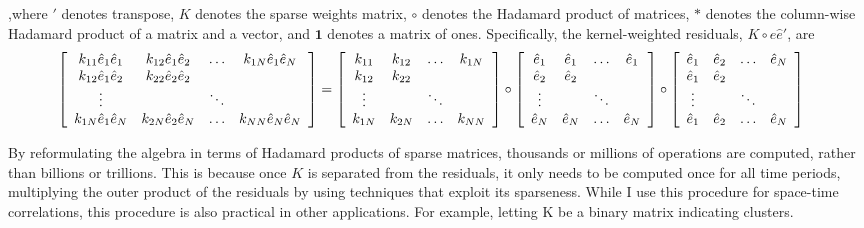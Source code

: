 ,where $'$ denotes transpose, $K$ denotes the sparse weights matrix, $\circ$ denotes the Hadamard product of matrices, $*$ denotes the column-wise Hadamard product of a matrix and a vector, and $\mathbf{1}$ denotes a matrix of ones. Specifically, the kernel-weighted residuals, $K \circ \hat{e} \hat{e}'$, are 
\begin{eqnarray*}
\hspace*{-1em}
\left[\begin{array}{cccc}
k_{11}\hat{e}_{1}\hat{e}_{1} & k_{12}\hat{e}_{1}\hat{e}_{2} & \hdots & k_{1N}\hat{e}_{1}\hat{e}_{N}  \\
k_{12}\hat{e}_{1}\hat{e}_{2} & k_{22}\hat{e}_{2}\hat{e}_{2} &	     & 		     					\\
\vdots						 &   				  			& \ddots &  	        					\\
k_{1N}\hat{e}_{1}\hat{e}_{N} & k_{2N}\hat{e}_{2}\hat{e}_{N} & \hdots & k_{NN}\hat{e}_{N}\hat{e}_{N}
\end{array}\right] 
=
\left[\begin{array}{cccc}
k_{11} & k_{12} & \hdots  & k_{1N}  \\
k_{12} & k_{22} & 	      & 		\\
\vdots	&   	& \ddots  &	 	\\
k_{1N} & k_{2N} & \hdots  & k_{NN}
\end{array}\right]
\circ
\left[\begin{array}{cccc}
\hat{e}_{1} & \hat{e}_{1} & \hdots  & \hat{e}_{1}  \\
\hat{e}_{2} & \hat{e}_{2} & 	    & 		       \\
\vdots		&   		  & \ddots  &  	           \\
\hat{e}_{N} & \hat{e}_{N} & \hdots  & \hat{e}_{N}
\end{array}\right]
\circ
\left[\begin{array}{cccc}
\hat{e}_{1} & \hat{e}_{2} & \hdots  & \hat{e}_{N} \\
\hat{e}_{1} & \hat{e}_{2} & 	    &			  \\
\vdots      &			  & \ddots  &			  \\
\hat{e}_{1} & \hat{e}_{2} & \hdots  & \hat{e}_{N}
\end{array}\right]
\end{eqnarray*}


By reformulating the algebra in terms of Hadamard products of sparse matrices, thousands or millions of operations are computed, rather than billions or trillions. This is because once $K$ is separated from the residuals, it only needs to be computed once for all time periods, multiplying the outer product of the residuals by using techniques that exploit its sparseness. While I use this procedure for space-time correlations, this procedure is also practical in other applications. For example, letting K be a binary matrix indicating clusters.


